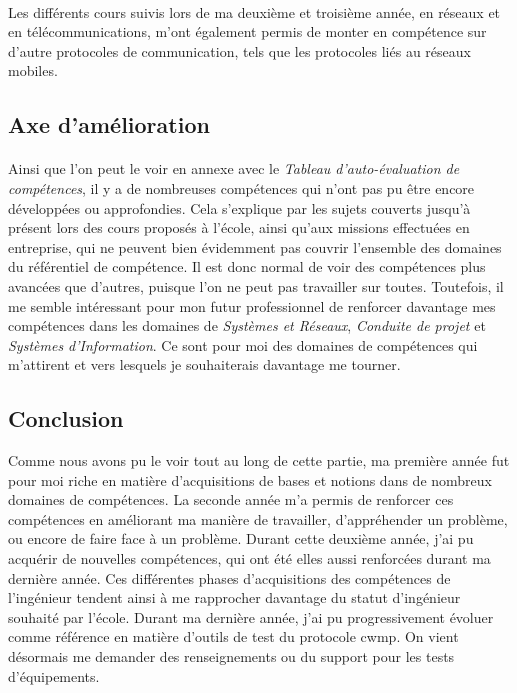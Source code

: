 \documentclass[12pt,a4paper]{report}
\begin{document}
\paragraph*{}Les différents cours suivis lors de ma deuxième et troisième année, en réseaux et en télécommunications, m'ont également permis de monter en compétence sur d'autre protocoles de communication, tels que les protocoles liés au réseaux mobiles. \\
 
\subsection{Axe d'amélioration}
\paragraph*{} Ainsi que l'on peut le voir en annexe avec le \textit{Tableau d'auto-évaluation de compétences}, il y a de nombreuses compétences qui n'ont pas pu être encore développées ou approfondies. Cela s'explique par les sujets couverts jusqu'à présent lors des cours proposés à l'école, ainsi qu'aux missions effectuées en entreprise, qui ne peuvent bien évidemment pas couvrir l'ensemble des domaines du référentiel de compétence. Il est donc normal de voir des compétences plus avancées que d'autres, puisque l'on ne peut pas travailler sur toutes. Toutefois, il me semble intéressant pour mon futur professionnel de renforcer davantage mes compétences dans les domaines de \textit{Systèmes et Réseaux}, \textit{Conduite de projet} et \textit{Systèmes d'Information}. Ce sont pour moi des domaines de compétences qui m'attirent et vers lesquels je souhaiterais davantage me tourner. \\

\subsection{Conclusion}
Comme nous avons pu le voir tout au long de cette partie, ma première année fut pour moi riche en matière d'acquisitions de bases et notions dans de nombreux domaines de compétences. La seconde année m'a permis de renforcer ces compétences en améliorant ma manière de travailler, d'appréhender un problème, ou encore de faire face à un problème. Durant cette deuxième année, j'ai pu acquérir de nouvelles compétences, qui ont été elles aussi renforcées durant ma dernière année. Ces différentes phases d'acquisitions des compétences de l'ingénieur tendent ainsi à me rapprocher davantage du statut d'ingénieur souhaité par l'école. Durant ma dernière année, j'ai pu progressivement évoluer comme référence en matière d'outils de test du protocole \gls{cwmp}. On vient désormais me demander des renseignements ou du support pour les tests d'équipements.
\end{document}
